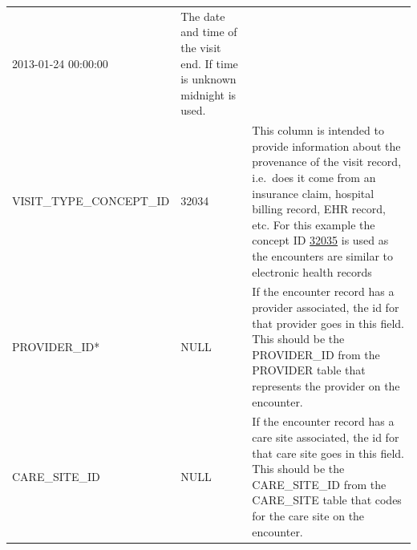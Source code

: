 \documentclass[11pt]{book}
\begin{document}
\begin{longtable}[]{@{}lll@{}}
\begin{minipage}[t]{0.15\columnwidth}
2013-01-24 00:00:00\strut
\end{minipage} & \begin{minipage}[t]{0.49\columnwidth}\raggedright\strut
The date and time of the visit end. If time is unknown midnight is
used.\strut
\end{minipage}\tabularnewline
\begin{minipage}[t]{0.27\columnwidth}\raggedright\strut
VISIT\_TYPE\_CONCEPT\_ID\strut
\end{minipage} & \begin{minipage}[t]{0.15\columnwidth}\raggedright\strut
32034\strut
\end{minipage} & \begin{minipage}[t]{0.49\columnwidth}\raggedright\strut
This column is intended to provide information about the provenance of
the visit record, i.e.~does it come from an insurance claim, hospital
billing record, EHR record, etc. For this example the concept ID
\href{http://athena.ohdsi.org/search-terms/terms/32035}{32035} is used
as the encounters are similar to electronic health records\strut
\end{minipage}\tabularnewline
\begin{minipage}[t]{0.27\columnwidth}\raggedright\strut
PROVIDER\_ID*\strut
\end{minipage} & \begin{minipage}[t]{0.15\columnwidth}\raggedright\strut
NULL\strut
\end{minipage} & \begin{minipage}[t]{0.49\columnwidth}\raggedright\strut
If the encounter record has a provider associated, the id for that
provider goes in this field. This should be the PROVIDER\_ID from the
PROVIDER table that represents the provider on the encounter.\strut
\end{minipage}\tabularnewline
\begin{minipage}[t]{0.27\columnwidth}\raggedright\strut
CARE\_SITE\_ID\strut
\end{minipage} & \begin{minipage}[t]{0.15\columnwidth}\raggedright\strut
NULL\strut
\end{minipage} & \begin{minipage}[t]{0.49\columnwidth}\raggedright\strut
If the encounter record has a care site associated, the id for that care
site goes in this field. This should be the CARE\_SITE\_ID from the
CARE\_SITE table that codes for the care site on the encounter.\strut
\end{minipage}\tabularnewline

\end{longtable}
\end{document}
